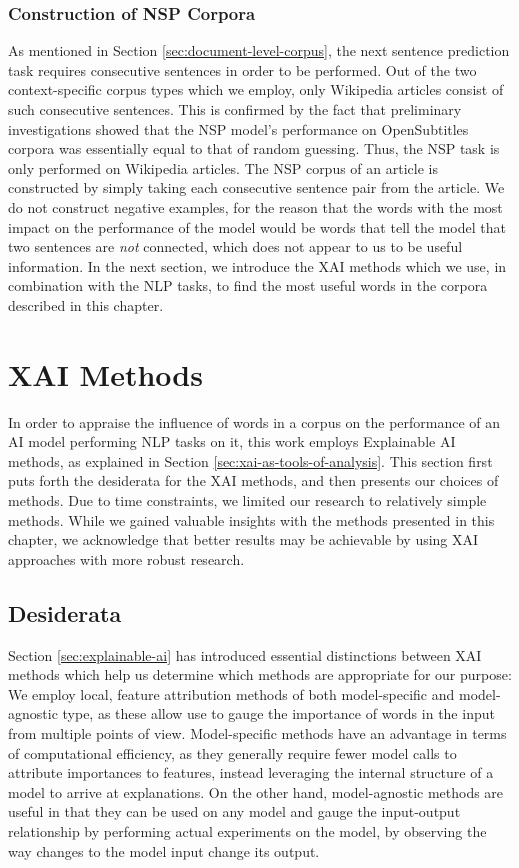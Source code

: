 \subsubsection{Construction of NSP Corpora}
As mentioned in Section \ref{sec:document-level-corpus}, the next sentence prediction task requires consecutive sentences in order to be performed.
Out of the two context-specific corpus types which we employ, only Wikipedia articles consist of such consecutive sentences.
This is confirmed by the fact that preliminary investigations showed that the NSP model's performance on OpenSubtitles corpora was essentially equal to that of random guessing.
Thus, the NSP task is only performed on Wikipedia articles.
The NSP corpus of an article is constructed by simply taking each consecutive sentence pair from the article.
We do not construct negative examples, for the reason that the words with the most impact on the performance of the model would be words that tell the model that two sentences are \textit{not} connected, which does not appear to us to be useful information.
In the next section, we introduce the XAI methods which we use, in combination with the NLP tasks, to find the most useful words in the corpora described in this chapter.

\section{XAI Methods} \label{sec:xai-methods}
In order to appraise the influence of words in a corpus on the performance of an AI model performing NLP tasks on it, this work employs Explainable AI methods, as explained in Section \ref{sec:xai-as-tools-of-analysis}.
This section first puts forth the desiderata for the XAI methods, and then presents our choices of methods.
Due to time constraints, we limited our research to relatively simple methods.
While we gained valuable insights with the methods presented in this chapter, we acknowledge that better results may be achievable by using XAI approaches with more robust research.

\subsection{Desiderata}
Section \ref{sec:explainable-ai} has introduced essential distinctions between XAI methods which help us determine which methods are appropriate for our purpose:
We employ local, feature attribution methods of both model-specific and model-agnostic type, as these allow use to gauge the importance of words in the input from multiple points of view.
Model-specific methods have an advantage in terms of computational efficiency, as they generally require fewer model calls to attribute importances to features, instead leveraging the internal structure of a model to arrive at explanations.
On the other hand, model-agnostic methods are useful in that they can be used on any model and gauge the input-output relationship by performing actual experiments on the model, by observing the way changes to the model input change its output.

